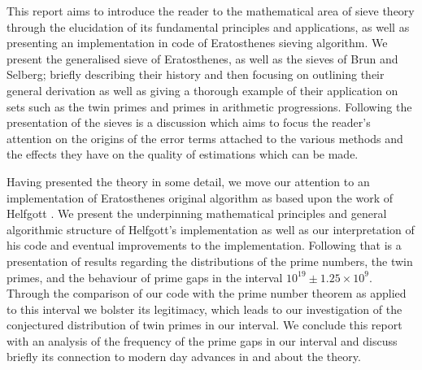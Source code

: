 This report aims to introduce the reader to the mathematical area of sieve theory through the elucidation of its fundamental principles and applications, as well as presenting an implementation in code of Eratosthenes sieving algorithm. 
We present the generalised sieve of Eratosthenes, as well as the sieves of Brun and Selberg; briefly describing their history and then focusing on outlining their general derivation as well as giving a thorough example of their application on sets such as the twin primes and primes in arithmetic progressions. 
Following the presentation of the sieves is a discussion which aims to focus the reader's attention on the origins of the error terms attached to the various methods and the effects they have on the quality of estimations which can be made.

Having presented the theory in some detail, we move our attention to an implementation of Eratosthenes original algorithm as based upon the work of Helfgott \cite{HaraldSieve}.
We present the underpinning mathematical principles and general algorithmic structure of Helfgott's implementation as well as our interpretation of his code and eventual improvements to the implementation.
Following that is a presentation of results regarding the distributions of the prime numbers, the twin primes, and the behaviour of prime gaps in the interval \(10^{19}\pm 1.25\times10^9\).
Through the comparison of our code with the prime number theorem as applied to this interval we bolster its legitimacy, which leads to our investigation of the conjectured distribution of twin primes in our interval.
We conclude this report with an analysis of the frequency of the prime gaps in our interval and discuss briefly its connection to modern day advances in and about the theory.
